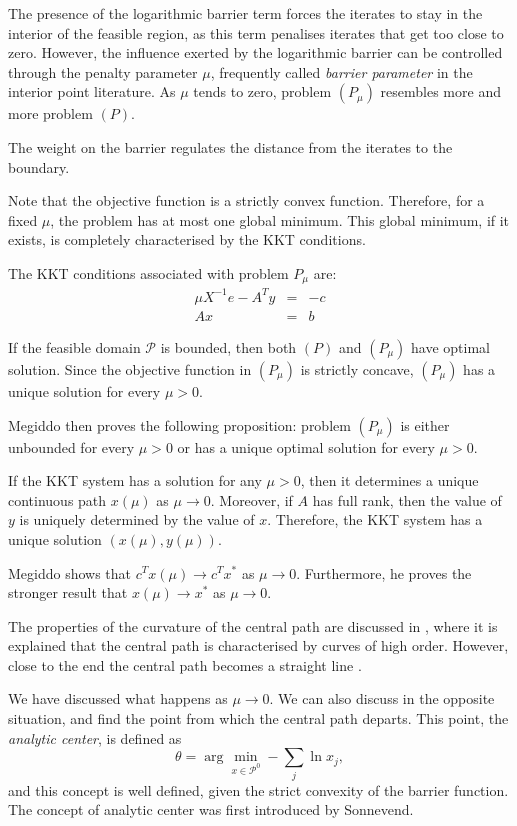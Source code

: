 The presence of the logarithmic barrier term forces the iterates 
to stay in the interior of the feasible region, as this term penalises 
iterates that get too close to zero. However, the influence exerted
by the logarithmic barrier can be controlled through the penalty
parameter $\mu$, frequently called {\em barrier parameter} in the interior
point literature. As $\mu$ tends to zero, problem $(P_\mu)$ resembles
more and more problem $(P)$.

The weight on the barrier regulates the distance from the iterates to 
the boundary.

Note that the objective function is a strictly convex function. 
Therefore, for a fixed $\mu$, the problem has at most one global minimum. 
This global minimum, if it exists, is completely characterised 
by the KKT conditions.

The KKT conditions associated with problem $P_\mu$ are:
\[
\begin{array}{lcc}
  \mu X^{-1}e -A^Ty & = & -c \\
   Ax               & = &  b
\end{array}
\]

If the feasible domain $\mathcal{P}$ is bounded, 
then both $(P)$ and $(P_\mu)$ have optimal solution. Since the 
objective function in $(P_\mu)$ is strictly concave, $(P_\mu)$ 
has a unique solution for every $\mu>0$.

Megiddo then proves the following proposition: problem $(P_\mu)$ 
is either unbounded for every  $\mu>0$ or has a unique optimal 
solution for every $\mu>0$.

If the KKT system has a solution for any $\mu>0$, then it 
determines a unique continuous path $x(\mu)$ as $\mu\to 0$. 
Moreover, if $A$ has full rank, then the value of $y$ is 
uniquely determined by the value of $x$. Therefore, the KKT 
system has a unique solution $(x(\mu),y(\mu))$.

Megiddo shows that $c^Tx(\mu)\to c^Tx^*$ as $\mu\to 0$. 
Furthermore, he proves the stronger result that 
$x(\mu)\to x^*$ as $\mu\to 0$.

The properties of the curvature of the central path are discussed
in \cite{VavasisYe}, where it is explained that the central path
is characterised by curves of high order. However, close to the end
the central path becomes a straight line \cite{Megiddo}.


We have discussed what happens as $\mu \to 0$. We can also discuss in
the opposite situation, and find the point from which the central path
departs.
This point, the {\em analytic center}, is defined as
\[
\theta = \arg \min_{x \in \mathcal{P}^0} -\sum_j \ln x_j,
\]
and this concept is well defined, given the strict convexity of the 
barrier function. The concept of analytic center was first 
introduced by Sonnevend.

